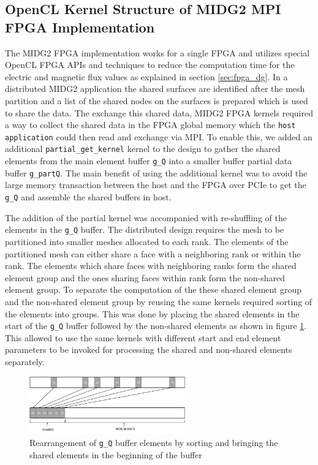 \subsection{OpenCL Kernel Structure of MIDG2 MPI FPGA Implementation}
\label{sec:midge_mpi}

The MIDG2 FPGA implementation works for a single FPGA and utilizes special OpenCL FPGA
APIs and techniques to reduce the computation time for the electric and magnetic flux values
as explained in section \ref{sec:fpga_dg}. In a distributed MIDG2 application the shared
surfaces are identified after the mesh partition and a list of the shared nodes on the
surfaces is prepared which is used to share the data.
The exchange this shared data, MIDG2 FPGA kernels required a way to collect the shared
data in the FPGA global memory which the \texttt{host application} could then read and
exchange via MPI. To enable this, we added an additional \texttt{partial\_get\_kernel}
kernel to the design to gather the shared elements from
the main element buffer \texttt{g\_Q} into a smaller buffer partial data buffer \texttt{g\_partQ}.
The main benefit of using the additional kernel was to avoid the large memory transaction between the
host and the FPGA over PCIe to get the \texttt{g\_Q} and assemble the shared buffers in host.

The addition of the partial kernel was accompanied with re-shuffling of the elements in the \texttt{g\_Q}
buffer. The distributed design requires the mesh to be partitioned into smaller meshes allocated
to each rank. The elements of the partitioned mesh can either share a face with a neighboring
rank or within the rank. The elements which share faces with neighboring ranks form the shared
element group and the ones sharing faces within rank form the non-shared element group.
To separate the computation of the these shared element group and the non-shared element group
by reusing the same kernels required sorting of the elements into groups. This was done by
placing the shared elements in the start of the \texttt{g\_Q} buffer followed by the non-shared
elements as shown in figure \ref{fig:rearrange}. This allowed to use the same kernels with different
start and end element parameters to be invoked for processing the shared and non-shared elements separately.
\begin{figure}%
    \centering
    \includegraphics[width=0.6\textwidth]{images/rearrange}
    \caption{Rearrangement of \texttt{g\_Q} buffer elements by sorting and bringing the
    shared elements in the beginning of the buffer}
    \label{fig:rearrange}
\end{figure}

